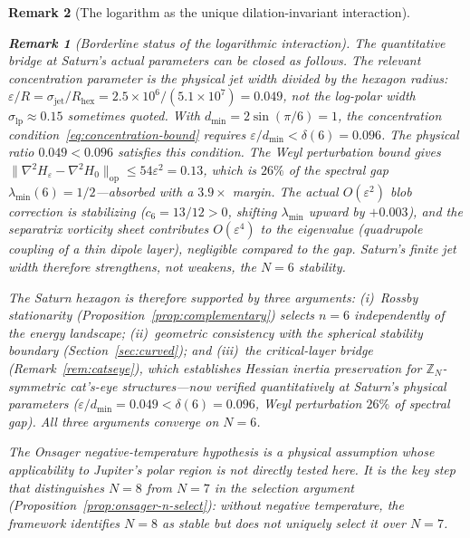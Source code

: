 \documentclass[12pt, a4paper]{article}
\newtheorem{remark}{Remark}[section]
\numberwithin{equation}{section}
\begin{document}
\begin{remark}[The logarithm as the unique dilation-invariant interaction]
\begin{remark}[Borderline status of the logarithmic interaction]
The quantitative bridge at Saturn's actual parameters can be closed
as follows.  The relevant concentration parameter is the
\emph{physical} jet width divided by the hexagon radius:
$\varepsilon/R = \sigma_{\mathrm{jet}}/R_{\mathrm{hex}}
= 2.5 \times 10^6/(5.1 \times 10^7) = 0.049$,
not the log-polar width $\sigma_{\mathrm{lp}} \approx 0.15$
sometimes quoted.  With $d_{\min} = 2\sin(\pi/6) = 1$, the
concentration condition~\eqref{eq:concentration-bound} requires
$\varepsilon/d_{\min} < \delta(6) = 0.096$.  The physical ratio
$0.049 < 0.096$ satisfies this condition.
The Weyl perturbation bound gives
$\|\nabla^2\!H_\varepsilon - \nabla^2\!H_0\|_{\mathrm{op}}
\le 54\varepsilon^2 = 0.13$, which is $26\%$ of the spectral gap
$\lambda_{\min}(6) = 1/2$---absorbed with a $3.9\times$ margin.
The actual $O(\varepsilon^2)$ blob correction is \emph{stabilizing}
($c_6 = 13/12 > 0$, shifting $\lambda_{\min}$ upward by $+0.003$),
and the separatrix vorticity sheet contributes $O(\varepsilon^4)$
to the eigenvalue (quadrupole coupling of a thin dipole layer),
negligible compared to the gap.  Saturn's finite jet width therefore
\emph{strengthens}, not weakens, the $N = 6$ stability.

The Saturn hexagon is therefore supported by three arguments:
(i)~Rossby stationarity (Proposition~\ref{prop:complementary}) selects
$n = 6$ independently of the energy landscape;
(ii)~geometric consistency with the spherical stability boundary
(Section~\ref{sec:curved}); and
(iii)~the critical-layer bridge (Remark~\ref{rem:catseye}), which
establishes Hessian inertia preservation for $\mathbb{Z}_N$-symmetric
cat's-eye structures---now verified quantitatively at Saturn's
physical parameters ($\varepsilon/d_{\min} = 0.049 < \delta(6) = 0.096$,
Weyl perturbation $26\%$ of spectral gap).  All three arguments
converge on $N = 6$.

The Onsager negative-temperature hypothesis is a physical assumption
whose applicability to Jupiter's polar region is not directly tested
here.  It is the key step that distinguishes $N = 8$ from $N = 7$
in the selection argument (Proposition~\ref{prop:onsager-n-select}):
without negative temperature, the framework identifies $N = 8$ as
\emph{stable} but does not uniquely select it over $N = 7$.


\end{remark}
\end{remark}
\end{document}
